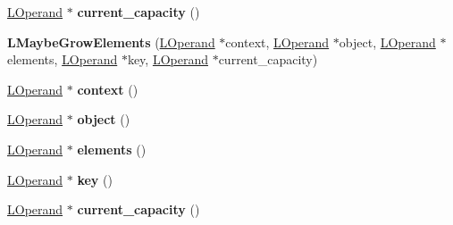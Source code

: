 \begin{DoxyCompactItemize}
\item 
\hyperlink{classv8_1_1internal_1_1_l_operand}{L\+Operand} $\ast$ {\bfseries current\+\_\+capacity} ()\hypertarget{classv8_1_1internal_1_1_l_maybe_grow_elements_a8fc52ebb7ecf6d10f977d9b56cfe702d}{}\label{classv8_1_1internal_1_1_l_maybe_grow_elements_a8fc52ebb7ecf6d10f977d9b56cfe702d}

\item 
{\bfseries L\+Maybe\+Grow\+Elements} (\hyperlink{classv8_1_1internal_1_1_l_operand}{L\+Operand} $\ast$context, \hyperlink{classv8_1_1internal_1_1_l_operand}{L\+Operand} $\ast$object, \hyperlink{classv8_1_1internal_1_1_l_operand}{L\+Operand} $\ast$elements, \hyperlink{classv8_1_1internal_1_1_l_operand}{L\+Operand} $\ast$key, \hyperlink{classv8_1_1internal_1_1_l_operand}{L\+Operand} $\ast$current\+\_\+capacity)\hypertarget{classv8_1_1internal_1_1_l_maybe_grow_elements_aae48ee99b99d58f8e16bc264666c78ff}{}\label{classv8_1_1internal_1_1_l_maybe_grow_elements_aae48ee99b99d58f8e16bc264666c78ff}

\item 
\hyperlink{classv8_1_1internal_1_1_l_operand}{L\+Operand} $\ast$ {\bfseries context} ()\hypertarget{classv8_1_1internal_1_1_l_maybe_grow_elements_a6af5b70c66f542bb308ac9ada8cb6372}{}\label{classv8_1_1internal_1_1_l_maybe_grow_elements_a6af5b70c66f542bb308ac9ada8cb6372}

\item 
\hyperlink{classv8_1_1internal_1_1_l_operand}{L\+Operand} $\ast$ {\bfseries object} ()\hypertarget{classv8_1_1internal_1_1_l_maybe_grow_elements_a557ff494aa6f7b9a2a5f218005419b34}{}\label{classv8_1_1internal_1_1_l_maybe_grow_elements_a557ff494aa6f7b9a2a5f218005419b34}

\item 
\hyperlink{classv8_1_1internal_1_1_l_operand}{L\+Operand} $\ast$ {\bfseries elements} ()\hypertarget{classv8_1_1internal_1_1_l_maybe_grow_elements_aa58e07c5ac443be8021a0a6dbfe237cb}{}\label{classv8_1_1internal_1_1_l_maybe_grow_elements_aa58e07c5ac443be8021a0a6dbfe237cb}

\item 
\hyperlink{classv8_1_1internal_1_1_l_operand}{L\+Operand} $\ast$ {\bfseries key} ()\hypertarget{classv8_1_1internal_1_1_l_maybe_grow_elements_ac0b59ca4db13f2a31428c9b8063321dc}{}\label{classv8_1_1internal_1_1_l_maybe_grow_elements_ac0b59ca4db13f2a31428c9b8063321dc}

\item 
\hyperlink{classv8_1_1internal_1_1_l_operand}{L\+Operand} $\ast$ {\bfseries current\+\_\+capacity} ()\hypertarget{classv8_1_1internal_1_1_l_maybe_grow_elements_a8fc52ebb7ecf6d10f977d9b56cfe702d}{}\label{classv8_1_1internal_1_1_l_maybe_grow_elements_a8fc52ebb7ecf6d10f977d9b56cfe702d}


\end{DoxyCompactItemize}
